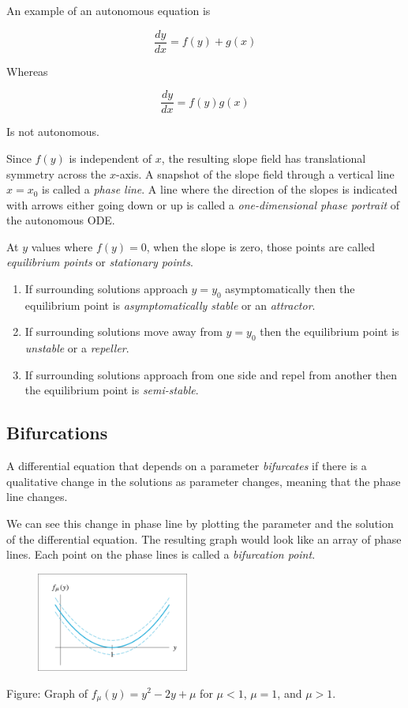 An example of an autonomous equation is

\[
    \frac{dy}{dx} = f(y) + g(x)
\]

Whereas

\[
    \frac{dy}{dx} = f(y)g(x)
\]

Is not autonomous.

Since $f(y)$ is independent of $x$, the resulting slope field has translational symmetry across the $x$-axis. A snapshot of the slope field through a vertical line $x = x_0$ is called a \textit{phase line}. A line where the direction of the slopes is indicated with arrows either going down or up is called a \textit{one-dimensional phase portrait} of the autonomous ODE.

At $y$ values where $f(y) = 0$, when the slope is zero, those points are called \textit{equilibrium points} or \textit{stationary points}.
\begin{enumerate}
    \item If surrounding solutions approach $y = y_0$ asymptomatically then the equilibrium point is \textit{asymptomatically stable} or an \textit{attractor}.
    \item If surrounding solutions move away from $y = y_0$ then the equilibrium point is \textit{unstable} or a \textit{repeller}.
    \item If surrounding solutions approach from one side and repel from another then the equilibrium point is \textit{semi-stable}.
\end{enumerate}

\subsection{Bifurcations}

A differential equation that depends on a parameter \textit{bifurcates} if there is a qualitative change in the solutions as parameter changes, meaning that the phase line changes.

We can see this change in phase line by plotting the parameter and the solution of the differential equation. The resulting graph would look like an array of phase lines. Each point on the phase lines is called a \textit{bifurcation point}.

\begin{figure}[H]
    \centering
    \includegraphics[width=50mm]{content/diffeq/images/bifurcation_0.png}
\end{figure}
Figure: Graph of $f_\mu(y) = y^2 - 2y + \mu$ for $\mu < 1$, $\mu = 1$, and $\mu > 1$.

